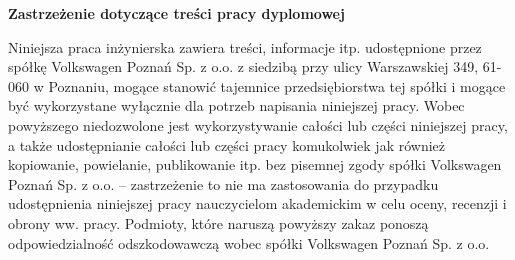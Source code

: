 \begin{center}
    \Large \textbf{Zastrzeżenie dotyczące treści pracy dyplomowej}
\end{center}

\vspace{1cm}


Niniejsza praca inżynierska zawiera treści, informacje itp. udostępnione przez spółkę Volkswagen Poznań Sp.
z o.o.
z siedzibą przy ulicy Warszawskiej 349, 61-060 w Poznaniu, mogące stanowić
tajemnice przedsiębiorstwa tej spółki i mogące być wykorzystane wyłącznie dla
potrzeb napisania niniejszej pracy. Wobec powyższego niedozwolone jest
wykorzystywanie całości lub części niniejszej pracy, a także udostępnianie całości
lub części pracy komukolwiek jak również kopiowanie, powielanie, publikowanie itp.
bez pisemnej zgody spółki Volkswagen Poznań Sp. z o.o. -- zastrzeżenie to nie ma
zastosowania do przypadku udostępnienia niniejszej pracy nauczycielom
akademickim w celu oceny, recenzji
i obrony ww. pracy. Podmioty, które naruszą powyższy zakaz ponoszą
odpowiedzialność odszkodowawczą wobec spółki Volkswagen Poznań Sp. z o.o.